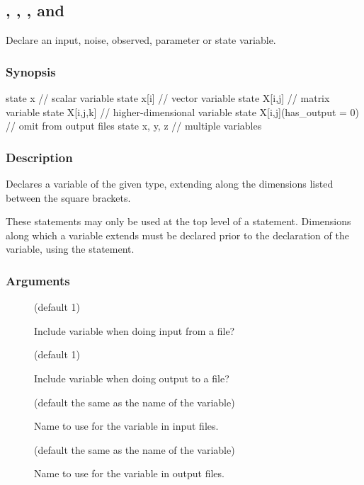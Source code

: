 \subsection{\label{input}, \label{noise}, \label{obs}, \label{param} and \label{state}}

Declare an input, noise, observed, parameter or state variable.

\subsubsection*{Synopsis\label{var_Synopsis}}

\begin{bicode}
state x                       // scalar variable
state x[i]                    // vector variable
state X[i,j]                  // matrix variable
state X[i,j,k]                // higher-dimensional variable
state X[i,j](has_output = 0)  // omit from output files
state x, y, z                 // multiple variables
\end{bicode}

\subsubsection*{Description\label{var_Description}}

Declares a variable of the given type, extending along the dimensions listed
between the square brackets.

These statements may only be used at the top level of a 
statement. Dimensions along which a variable extends must be declared
prior to the declaration of the variable, using the  statement.

\subsubsection*{Arguments\label{var_Arguments}}

\begin{description}
\item[] (default 1)

Include variable when doing input from a file?

\item[] (default 1)

Include variable when doing output to a file?

\item[] (default the same as the name of the
  variable)

Name to use for the variable in input files.

\item[] (default the same as the name of the
  variable)

Name to use for the variable in output files.
\end{description}


